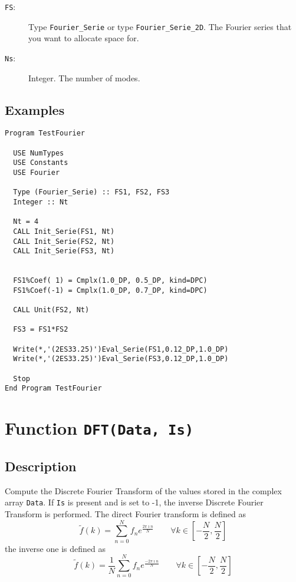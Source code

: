\begin{description}
\item[\texttt{FS}:] Type \texttt{Fourier\_Serie} or type
  \texttt{Fourier\_Serie\_2D}. The Fourier series that you want
  to allocate space for.
\item[\texttt{Ns}:] Integer. The number of modes.
\end{description}

\subsection{Examples}

\begin{lstlisting}[emph=Unit,
                   emphstyle=\color{blue},
                   frame=trBL,
                   caption=Obtaining a constant Fourier series.,
                   label=unit]
Program TestFourier

  USE NumTypes
  USE Constants
  USE Fourier

  Type (Fourier_Serie) :: FS1, FS2, FS3
  Integer :: Nt

  Nt = 4
  CALL Init_Serie(FS1, Nt)
  CALL Init_Serie(FS2, Nt)
  CALL Init_Serie(FS3, Nt)


  FS1%Coef( 1) = Cmplx(1.0_DP, 0.5_DP, kind=DPC)
  FS1%Coef(-1) = Cmplx(1.0_DP, 0.7_DP, kind=DPC)

  CALL Unit(FS2, Nt)

  FS3 = FS1*FS2

  Write(*,'(2ES33.25)')Eval_Serie(FS1,0.12_DP,1.0_DP)
  Write(*,'(2ES33.25)')Eval_Serie(FS3,0.12_DP,1.0_DP)

  Stop
End Program TestFourier
\end{lstlisting}


\section{Function \texttt{DFT(Data, Is)}}

\subsection{Description}

Compute the Discrete Fourier Transform of the values stored in the
complex array \texttt{Data}. If \texttt{Is} is present and 
is set to -1, the inverse Discrete Fourier Transform is performed. The
direct Fourier transform is defined as
\begin{displaymath}
  \tilde f(k) = \sum_{n=0}^N f_ne^{\frac{2\pi\imath n}{N}}\qquad\forall k
  \in \left[-\frac{N}{2}, \frac{N}{2}\right]
\end{displaymath}
the inverse one is defined as
\begin{displaymath}
  \tilde f(k) = \frac{1}{N}\sum_{n=0}^N f_ne^{\frac{-2\pi\imath
      n}{N}}\qquad\forall k 
  \in \left[-\frac{N}{2}, \frac{N}{2}\right]
\end{displaymath}


